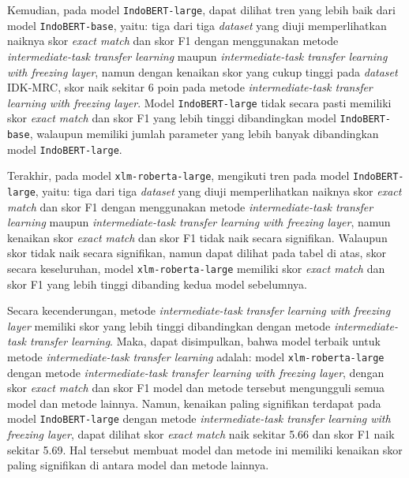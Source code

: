 Kemudian, pada model \texttt{IndoBERT-large}, dapat dilihat tren yang lebih baik dari model \texttt{IndoBERT-base}, yaitu: tiga dari tiga \emph{dataset} yang diuji memperlihatkan naiknya skor \emph{exact match} dan skor F1 dengan menggunakan metode \emph{intermediate-task transfer learning} maupun \emph{intermediate-task transfer learning with freezing layer}, namun dengan kenaikan skor yang cukup tinggi pada \emph{dataset} IDK-MRC, skor naik sekitar 6 poin pada metode \emph{intermediate-task transfer learning with freezing layer}. Model \texttt{IndoBERT-large} tidak secara pasti memiliki skor \emph{exact match} dan skor F1 yang lebih tinggi dibandingkan model \texttt{IndoBERT-base}, walaupun memiliki jumlah parameter yang lebih banyak dibandingkan model \texttt{IndoBERT-large}.

Terakhir, pada model \texttt{xlm-roberta-large}, mengikuti tren pada model \texttt{IndoBERT-large}, yaitu: tiga dari tiga \emph{dataset} yang diuji memperlihatkan naiknya skor \emph{exact match} dan skor F1 dengan menggunakan metode \emph{intermediate-task transfer learning} maupun \emph{intermediate-task transfer learning with freezing layer}, namun kenaikan skor \emph{exact match} dan skor F1 tidak naik secara signifikan. Walaupun skor tidak naik secara signifikan, namun dapat dilihat pada tabel di atas, skor secara keseluruhan, model \texttt{xlm-roberta-large} memiliki skor \emph{exact match} dan skor F1 yang lebih tinggi dibanding kedua model sebelumnya.

Secara kecenderungan, metode \emph{intermediate-task transfer learning with freezing layer} memiliki skor yang lebih tinggi dibandingkan dengan metode \emph{intermediate-task transfer learning}. Maka, dapat disimpulkan, bahwa model terbaik untuk metode \emph{intermediate-task transfer learning} adalah: model \texttt{xlm-roberta-large} dengan metode \emph{intermediate-task transfer learning with freezing layer}, dengan skor \emph{exact match} dan skor F1 model dan metode tersebut mengungguli semua model dan metode lainnya. Namun, kenaikan paling signifikan terdapat pada model \texttt{IndoBERT-large} dengan metode \emph{intermediate-task transfer learning with freezing layer}, dapat dilihat skor \emph{exact match} naik sekitar 5.66 dan skor F1 naik sekitar 5.69. Hal tersebut membuat model dan metode ini memiliki kenaikan skor paling signifikan di antara model dan metode lainnya. 

